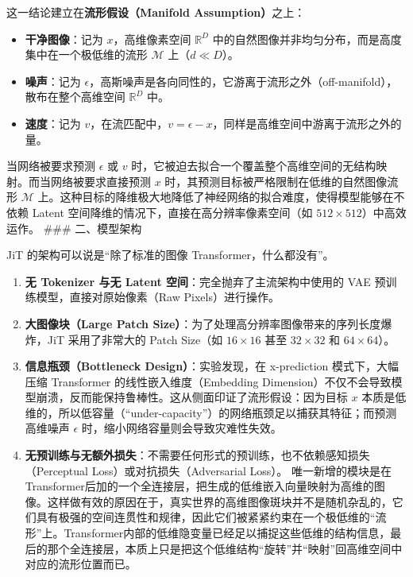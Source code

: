这一结论建立在\textbf{流形假设（Manifold Assumption）}之上：

\begin{itemize}
\tightlist
\item
  \textbf{干净图像}：记为 \(x\)，高维像素空间 \(\mathbb{R}^D\) 中的自然图像并非均匀分布，而是高度集中在一个极低维的流形 \(\mathcal{M}\) 上（\(d\ll D\)）。
\item
  \textbf{噪声}：记为 \(\epsilon\)，高斯噪声是各向同性的，它游离于流形之外（off-manifold），散布在整个高维空间 \(\mathbb{R}^D\) 中。
\item
  \textbf{速度}：记为 \(v\)，在流匹配中，\(v=\epsilon-x\)，同样是高维空间中游离于流形之外的量。
\end{itemize}

当网络被要求预测 \(\epsilon\) 或 \(v\) 时，它被迫去拟合一个覆盖整个高维空间的无结构映射。而当网络被要求直接预测 \(x\) 时，其预测目标被严格限制在低维的自然图像流形 \(\mathcal{M}\) 上。这种目标的降维极大地降低了神经网络的拟合难度，使得模型能够在不依赖 Latent 空间降维的情况下，直接在高分辨率像素空间（如 \(512\times512\)）中高效运作。
\#\#\# 二、模型架构

JiT 的架构可以说是``除了标准的图像 Transformer，什么都没有''。

\begin{enumerate}
\def\labelenumi{\arabic{enumi}.}
\tightlist
\item
  \textbf{无 Tokenizer 与无 Latent 空间}：完全抛弃了主流架构中使用的 VAE 预训练模型，直接对原始像素（Raw Pixels）进行操作。
\item
  \textbf{大图像块（Large Patch Size）}：为了处理高分辨率图像带来的序列长度爆炸，JiT 采用了非常大的 Patch Size（如 \(16\times16\) 甚至 \(32\times32\) 和 \(64\times64\)）。
\item
  \textbf{信息瓶颈（Bottleneck Design）}：实验发现，在 x-prediction 模式下，大幅压缩 Transformer 的线性嵌入维度（Embedding Dimension）不仅不会导致模型崩溃，反而能保持鲁棒性。这从侧面印证了流形假设：因为目标 \(x\) 本质是低维的，所以低容量（``under-capacity''）的网络瓶颈足以捕获其特征；而预测高维噪声 \(\epsilon\) 时，缩小网络容量则会导致灾难性失效。
\item
  \textbf{无预训练与无额外损失}：不需要任何形式的预训练，也不依赖感知损失（Perceptual Loss）或对抗损失（Adversarial Loss）。
  唯一新增的模块是在Transformer后加的一个全连接层，把生成的低维嵌入向量映射为高维的图像。这样做有效的原因在于，真实世界的高维图像斑块并不是随机杂乱的，它们具有极强的空间连贯性和规律，因此它们被紧紧约束在一个极低维的``流形''上。Transformer内部的低维隐变量已经足以捕捉这些低维的结构信息，最后的那个全连接层，本质上只是把这个低维结构``旋转''并``映射''回高维空间中对应的流形位置而已。
\end{enumerate}

